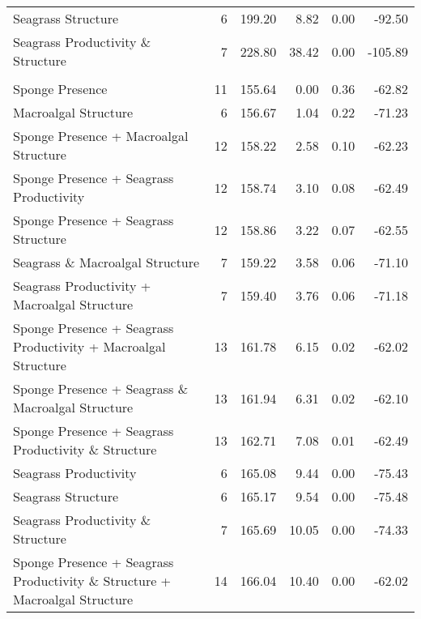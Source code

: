 \documentclass[
]{article}
\begin{document}
\begin{table}
{\begin{tabular}[t]{lrrrrr}
\hspace{1em}Seagrass Structure & 6 & 199.20 & 8.82 & 0.00 & -92.50\\
\hspace{1em}Seagrass Productivity \& Structure & 7 & 228.80 & 38.42 & 0.00 & -105.89\\
\addlinespace[0.3em]
\multicolumn{6}{l}{\textbf{Species Richness}}\\
\hspace{1em}Sponge Presence & 11 & 155.64 & 0.00 & 0.36 & -62.82\\
\hspace{1em}Macroalgal Structure & 6 & 156.67 & 1.04 & 0.22 & -71.23\\
\hspace{1em}Sponge Presence + Macroalgal Structure & 12 & 158.22 & 2.58 & 0.10 & -62.23\\
\hspace{1em}Sponge Presence + Seagrass Productivity & 12 & 158.74 & 3.10 & 0.08 & -62.49\\
\hspace{1em}Sponge Presence + Seagrass Structure & 12 & 158.86 & 3.22 & 0.07 & -62.55\\
\hspace{1em}Seagrass \& Macroalgal Structure & 7 & 159.22 & 3.58 & 0.06 & -71.10\\
\hspace{1em}Seagrass Productivity + Macroalgal Structure & 7 & 159.40 & 3.76 & 0.06 & -71.18\\
\hspace{1em}Sponge Presence + Seagrass Productivity + Macroalgal Structure & 13 & 161.78 & 6.15 & 0.02 & -62.02\\
\hspace{1em}Sponge Presence + Seagrass \& Macroalgal Structure & 13 & 161.94 & 6.31 & 0.02 & -62.10\\
\hspace{1em}Sponge Presence + Seagrass Productivity \& Structure & 13 & 162.71 & 7.08 & 0.01 & -62.49\\
\hspace{1em}Seagrass Productivity & 6 & 165.08 & 9.44 & 0.00 & -75.43\\
\hspace{1em}Seagrass Structure & 6 & 165.17 & 9.54 & 0.00 & -75.48\\
\hspace{1em}Seagrass Productivity \& Structure & 7 & 165.69 & 10.05 & 0.00 & -74.33\\
\hspace{1em}Sponge Presence + Seagrass Productivity \& Structure + Macroalgal Structure & 14 & 166.04 & 10.40 & 0.00 & -62.02\\
\bottomrule
\end{tabular}}
\end{table}
\end{document}
